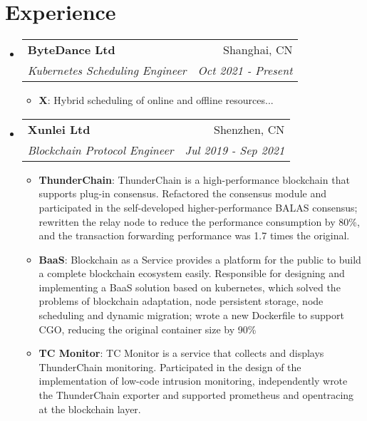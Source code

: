 \documentclass[letterpaper,12pt]{article}
\makeatletter
\newcommand{\resumeItem}[2]{
  \item\small{
    \textbf{#1}{: #2 \vspace{-2pt}}
  }
}
\newcommand{\resumeSubheading}[4]{
  \vspace{-1pt}\item
    \begin{tabular*}{0.97\textwidth}[t]{l@{\extracolsep{\fill}}r}
      \textbf{#1} & #2 \\
      \textit{\small#3} & \textit{\small #4} \\
    \end{tabular*}\vspace{-5pt}
}
\newcommand{\resumeSubHeadingListStart}{\begin{itemize}[leftmargin=*]}
\newcommand{\resumeSubHeadingListEnd}{\end{itemize}}
\newcommand{\resumeItemListStart}{\begin{itemize}}
\newcommand{\resumeItemListEnd}{\end{itemize}\vspace{-5pt}}
\makeatother
\begin{document}
\section{Experience}
  \resumeSubHeadingListStart
    \resumeSubheading
      {ByteDance Ltd}{Shanghai, CN}
      {Kubernetes Scheduling Engineer}{Oct 2021 - Present}
      \resumeItemListStart
        \resumeItem{X}
          {Hybrid scheduling of online and offline resources...}
      \resumeItemListEnd
    \resumeSubheading
      {Xunlei Ltd}{Shenzhen, CN}
      {Blockchain Protocol Engineer}{Jul 2019 - Sep 2021}
      \resumeItemListStart
        \resumeItem{ThunderChain}
          {ThunderChain is a high-performance blockchain that supports plug-in consensus.
          Refactored the consensus module and participated in the self-developed higher-performance
          BALAS consensus; rewritten the relay node to reduce the performance consumption by 80\%,
          and the transaction forwarding performance was 1.7 times the original.}
        \resumeItem{BaaS}
          {Blockchain as a Service provides a platform for the public to build a
          complete blockchain ecosystem easily.
          Responsible for designing and implementing a BaaS solution based on kubernetes, which solved the 
          problems of blockchain adaptation, node persistent storage, node scheduling and dynamic migration; 
          wrote a new Dockerfile to support CGO, reducing the original container size by 90\%}
        \resumeItem{TC Monitor}
          {TC Monitor is a service that collects and displays ThunderChain monitoring. Participated in
          the design of the implementation of low-code intrusion monitoring, independently wrote the
          ThunderChain exporter and supported prometheus and opentracing at the blockchain layer.}
      \resumeItemListEnd
  \resumeSubHeadingListEnd

\end{document}
